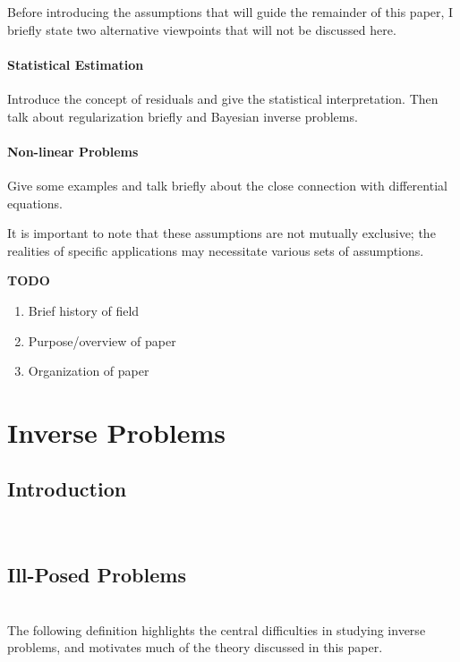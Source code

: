 \documentclass[12pt]{article}
\begin{document}
Before introducing the assumptions that will guide the remainder of this paper, I briefly
state two alternative viewpoints that will not be discussed here. 

\paragraph*{Statistical Estimation}

Introduce the concept of residuals and give the statistical interpretation. Then talk about regularization briefly
and Bayesian inverse problems. 

\paragraph*{Non-linear Problems}

Give some examples and talk briefly about the close connection with differential equations. 

It is important to note that these assumptions are not mutually exclusive; the realities of specific applications
may necessitate various sets of assumptions. 



\textbf{TODO}
\begin{enumerate} 
\item Brief history of field
\item Purpose/overview of paper
\item Organization of paper
\end{enumerate} 

\section{Inverse Problems}

\subsection{Introduction} \hfill \\
 

\subsection{Ill-Posed Problems} \hfill \\
The following definition highlights the central difficulties in studying inverse problems, and motivates much of the theory discussed in this paper. \\
\end{document}
